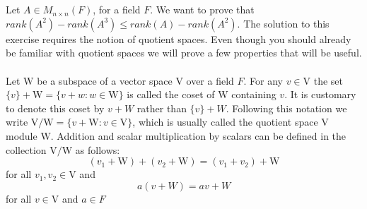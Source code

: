 \documentclass[11pt]{scrartcl}
\begin{document}
\section{}
Let $A \in M_{n\times n}(F)$, for a field $F$.
We want to prove that $rank(A^2) - rank(A^3) \leq rank(A) - rank(A^2)$.
The solution to this exercise requires the notion of quotient spaces.
Even though you should already be familiar with quotient spaces we will prove a few properties that will be useful.\\ \-\\
Let \(\mathrm{W}\) be a subspace of a vector space \(\mathrm{V}\) over a field \(F .\) For any \(v \in \mathrm{V}\) the set \(\{v\}+\mathrm{W}=\{v+w: w \in \mathrm{W}\}\) is called the coset of W containing \(v .\) It is customary to denote this coset by \(v+W\) rather than \(\{v\}+W\).
Following this notation we write $\mathrm{V}/\mathrm{W} = \{ v + \mathrm{W}: v \in \mathrm{V} \}$, which is usually called the quotient space $\mathrm{V}$ module $\mathrm{W}$. Addition and scalar multiplication by scalars can be defined in the collection \(\mathrm{V}/\mathrm{W}\) as follows:
$$
	\left(v_{1}+\mathrm{W}\right)+\left(v_{2}+\mathrm{W}\right)=\left(v_{1}+v_{2}\right)+\mathrm{W}
$$
for all \(v_{1}, v_{2} \in \mathrm{V}\) and
$$
	a(v+W)=a v+W
$$
for all \(v \in \mathrm{V}\) and \(a \in F\)
\end{document}
